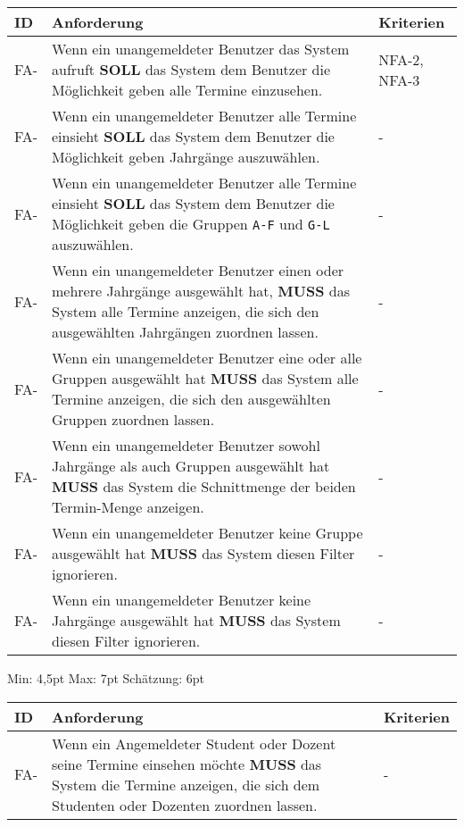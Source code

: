 \begin{tabular} {|p{}|p{11cm}|p{}|}
	\hline
	ID & Anforderung & Kriterien \\
	\hline
	FA-
	& Wenn ein unangemeldeter Benutzer das System aufruft \textbf{SOLL} das System dem Benutzer die Möglichkeit geben alle Termine einzusehen. 
	& NFA-2, NFA-3 \\
	\hline
	FA- 
	& Wenn ein unangemeldeter Benutzer alle Termine einsieht \textbf{SOLL} das System dem Benutzer die Möglichkeit geben Jahrgänge auszuwählen.
	& -  \\
	\hline
	FA- 
	& Wenn ein unangemeldeter Benutzer alle Termine einsieht \textbf{SOLL} das System dem Benutzer die Möglichkeit geben die Gruppen \texttt{A-F} und \texttt{G-L} auszuwählen.
	& - \\
	\hline
	FA-
	& Wenn ein unangemeldeter Benutzer einen oder mehrere Jahrgänge ausgewählt hat, \textbf{MUSS} das System alle Termine anzeigen, die sich den ausgewählten Jahrgängen zuordnen lassen.
	& - \\
	\hline
	FA-
	& Wenn ein unangemeldeter Benutzer eine oder alle Gruppen ausgewählt hat \textbf{MUSS} das System alle Termine anzeigen, die sich den ausgewählten Gruppen zuordnen lassen.
	& - \\
	\hline
	FA-
	& Wenn ein unangemeldeter Benutzer sowohl Jahrgänge als auch Gruppen ausgewählt hat \textbf{MUSS} das System die Schnittmenge der beiden Termin-Menge anzeigen.
	& - \\
	\hline
	FA-
	& Wenn ein unangemeldeter Benutzer keine Gruppe ausgewählt hat \textbf{MUSS} das System diesen Filter ignorieren.
	& - \\
	\hline
	FA-
	& Wenn ein unangemeldeter Benutzer keine Jahrgänge ausgewählt hat \textbf{MUSS} das System diesen Filter ignorieren.
	& - \\
	\hline
\end{tabular}
Min: 4,5pt
Max: 7pt
Schätzung: 6pt

\newpage

\begin{tabular} {|p{}|p{11cm}|p{}|}
	\hline
	ID & Anforderung & Kriterien \\
	\hline
	FA-
	& Wenn ein Angemeldeter Student oder Dozent seine Termine einsehen möchte \textbf{MUSS} das System die Termine anzeigen, die sich dem Studenten oder Dozenten zuordnen lassen. 
	& - \\
	\hline
\end{tabular}

\newpage

